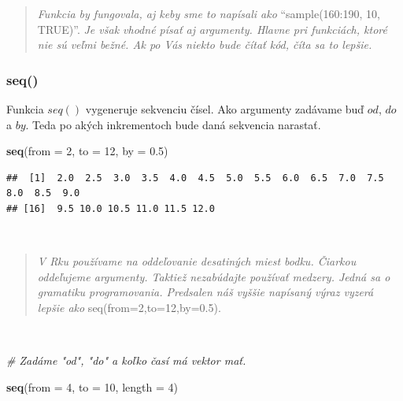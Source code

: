 \documentclass[]{article}
\newenvironment{Shaded}{\begin{snugshade}}{\end{snugshade}}
\newcommand{\CommentTok}[1]{\textcolor[rgb]{0.56,0.35,0.01}{\textit{#1}}}
\newcommand{\DataTypeTok}[1]{\textcolor[rgb]{0.13,0.29,0.53}{#1}}
\newcommand{\DecValTok}[1]{\textcolor[rgb]{0.00,0.00,0.81}{#1}}
\newcommand{\FloatTok}[1]{\textcolor[rgb]{0.00,0.00,0.81}{#1}}
\newcommand{\KeywordTok}[1]{\textcolor[rgb]{0.13,0.29,0.53}{\textbf{#1}}}
\newcommand{\NormalTok}[1]{#1}
\begin{document}
\begin{quote}
\emph{Funkcia by fungovala, aj keby sme to napísali ako}
``sample(160:190, 10, TRUE)''. \emph{Je však vhodné písať aj argumenty.
Hlavne pri funkciách, ktoré nie sú veľmi bežné. Ak po Vás niekto bude
čítať kód, číta sa to lepšie.}
\end{quote}

\newpage

\hypertarget{seq}{%
\subsubsection{seq()}\label{seq}}

Funkcia \(seq()\) vygeneruje sekvenciu čísel. Ako argumenty zadávame buď
\(od\), \(do\) a \(by\). Teda po akých inkrementoch bude daná sekvencia
narastať.

\begin{Shaded}
\begin{Highlighting}[]
\KeywordTok{seq}\NormalTok{(}\DataTypeTok{from =} \DecValTok{2}\NormalTok{, }\DataTypeTok{to =} \DecValTok{12}\NormalTok{, }\DataTypeTok{by =} \FloatTok{0.5}\NormalTok{)}
\end{Highlighting}
\end{Shaded}

\begin{verbatim}
##  [1]  2.0  2.5  3.0  3.5  4.0  4.5  5.0  5.5  6.0  6.5  7.0  7.5  8.0  8.5  9.0
## [16]  9.5 10.0 10.5 11.0 11.5 12.0
\end{verbatim}

~

\begin{quote}
\emph{V Rku používame na oddeľovanie desatiných miest bodku. Čiarkou
oddeľujeme argumenty. Taktiež nezabúdajte používať medzery. Jedná sa o
gramatiku programovania. Predsalen náš vyššie napísaný výraz vyzerá
lepšie ako} seq(from=2,to=12,by=0.5).
\end{quote}

~

\begin{Shaded}
\begin{Highlighting}[]
\CommentTok{# Zadáme "od", "do" a koľko časí má vektor mať.}

\KeywordTok{seq}\NormalTok{(}\DataTypeTok{from =} \DecValTok{4}\NormalTok{, }\DataTypeTok{to =} \DecValTok{10}\NormalTok{, }\DataTypeTok{length =} \DecValTok{4}\NormalTok{) }
\end{Highlighting}
\end{Shaded}
\end{document}
